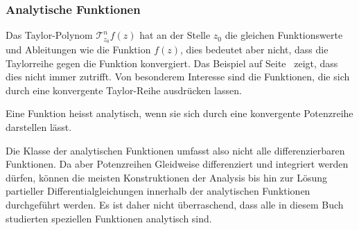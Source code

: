 %
%
\subsubsection{Analytische Funktionen}
Das Taylor-Polynom $\mathscr{T}_{z_0}^nf(z)$ hat an der Stelle $z_0$
die gleichen Funktionswerte und Ableitungen wie die Funktion $f(z)$,
dies bedeutet aber nicht, dass die Taylorreihe gegen die Funktion 
konvergiert.
Das Beispiel auf
Seite~\pageref{buch:funktionentheorie:beispiel:nichtanalytisch}
zeigt, dass dies nicht immer zutrifft.
Von besonderem Interesse sind die Funktionen, die sich durch eine
konvergente Taylor-Reihe ausdrücken lassen.

\begin{definition}
\label{buch:polynome:def:analytisch}
%
Eine Funktion heisst analytisch, wenn sie sich durch eine
konvergente Potenzreihe darstellen lässt.
\end{definition}

Die Klasse der analytischen Funktionen umfasst also nicht alle 
differenzierbaren Funktionen.
Da aber Potenzreihen Gleidweise differenziert und integriert werden
dürfen, können die meisten Konstruktionen der Analysis bis hin zur
Lösung partieller Differentialgleichungen innerhalb der analytischen
Funktionen durchgeführt werden.
Es ist daher nicht überraschend, dass alle in diesem Buch studierten
speziellen Funktionen analytisch sind.


